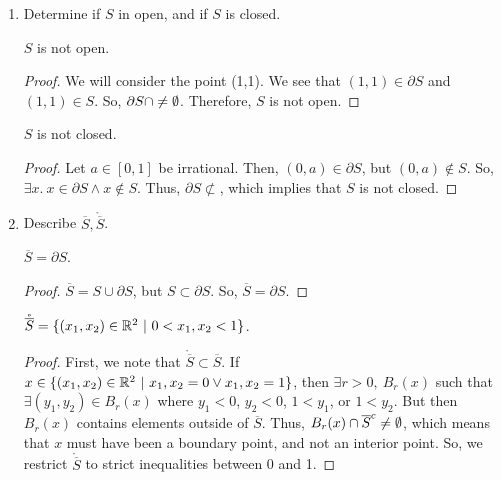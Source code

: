 \documentclass[../hw1]{subfiles}
\begin{document}
\begin{problem}
\begin{enumerate}[label=\alph*)]
\begin{proof}
		      Since $S\subset \partial S$ and $T\subset \partial S$, then $\{(a,b)\in \R^2\ |\ 0\le a,b\le 1\} = S\cup T \subset \partial S$.

		      ($\subset $) If $x\in \partial S$ is rational and in the unit square, then $x\in S$ as well. If $x$ is instead irrational, then it belongs in  $T$. Thus, $\partial S \subset S \cup T$.
	      \end{proof}

	\item Determine if $S$ in open, and if $S$ is closed.
	      \begin{proposition}
		      $S$ is not open.
	      \end{proposition}
	      \begin{proof}
		      We will consider the point (1,1). We see that $(1,1)\in \partial S$ and $(1,1)\in S$. So, $\partial S \cap \neq \emptyset$. Therefore, $S$ is not open.
	      \end{proof}
	      \begin{proposition}
		      $S$ is not closed.
	      \end{proposition}
	      \begin{proof}
		      Let $a\in [0,1]$ be irrational. Then, $(0,a)\in \partial S$, but $(0,a)\not\in S$. So, $\exists x.\ x\in \partial S \land x\not\in S$. Thus, $\partial S \not \subset $, which implies that $S$ is not closed.
	      \end{proof}
	\item Describe $\overline{S},\mathring{\overline{S}}$.
	      \begin{proposition}
		      $\overline{S}=\partial{S}$.
	      \end{proposition}
	      \begin{proof}
		      $\overline{S}=S\cup \partial{S}$, but $S\subset \partial{S}$. So, $\overline{S}=\partial{S}$.
	      \end{proof}
	      \begin{proposition}
		      $\mathring{\overline{S}}=\{(x_1,x_2)\in \mathbb{R}^{2}\ |\ 0<x_1,x_2<1 \}$.
	      \end{proposition}
	      \begin{proof}
		      First, we note that $\mathring{\overline{S}}\subset \overline{S}$. If $x\in \{(x_1,x_2)\in \mathbb{R}^{2}\ |\ x_1,x_2=0 \lor x_1,x_2=1\}$, then $\exists r>0,\ B_r(x)$ such that $\exists (y_1,y_2)\in B_r(x)$ where $y_1<0$, $y_2<0$, $1<y_1$, or $1<y_2$. But then $B_r(x)$ contains elements outside of $\overline{S}$. Thus, $B_r(x)\cap \overline{S}^{c}\neq \emptyset$, which means that $x$ must have been a boundary point, and not an interior point. So, we restrict $\mathring{\overline{S}}$ to strict inequalities between 0 and 1.
	      \end{proof}



\end{enumerate}
\end{problem}
\end{document}
